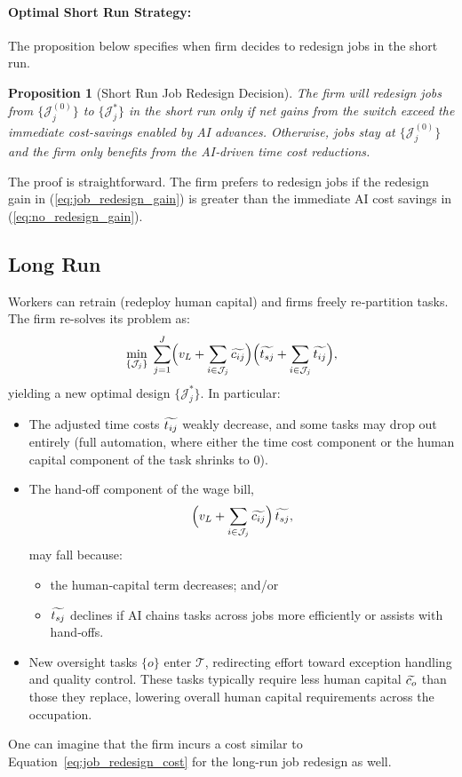\documentclass{article}
\theoremstyle{plain}
\theoremstyle{plain}
\newtheorem{proposition}[theorem]{Proposition}
\begin{document}
\paragraph{Optimal Short Run Strategy:}
The proposition below specifies when firm decides to redesign jobs in the short run.
\begin{proposition}[Short Run Job Redesign Decision] \label{prop:shortrun_redesign}
The firm will redesign jobs from \(\{\mathcal{J}_j^{(0)}\}\) to \(\{\mathcal{J}_j^*\}\) in the short run only if net gains from the switch exceed the immediate cost-savings enabled by AI advances.
Otherwise, jobs stay at \(\{\mathcal{J}_j^{(0)}\}\) and the firm only benefits from the AI‐driven time cost reductions.
\end{proposition}
The proof is straightforward. 
The firm prefers to redesign jobs if the redesign gain in (\ref{eq:job_redesign_gain}) is greater than the immediate AI cost savings in (\ref{eq:no_redesign_gain}).



\subsection{Long Run}  

Workers can retrain (redeploy human capital) and firms freely re‐partition tasks.  
The firm re-solves its problem as:
\[
\min_{\{\mathcal{J}_j\}}\;
\sum_{j=1}^J 
\Bigl(v_L + \sum_{i\in\mathcal{J}_j}\widetilde{c_{ij}}\Bigr)
\Bigl(\widetilde{t_{sj}} + \sum_{i\in\mathcal{J}_j}\widetilde{t_{ij}}\Bigr),
\]
yielding a new optimal design \(\{\mathcal{J}_j^*\}\).  
In particular:
\begin{itemize}
  \item The adjusted time costs \(\widetilde{t_{ij}}\) weakly decrease, and some tasks may drop out entirely (full automation, where either the time cost component or the human capital component of the task shrinks to 0).
  \item The hand‐off component of the wage bill,
  \[
    \Bigl(v_L + \sum_{i\in\mathcal{J}_j}\widetilde{c_{ij}}\Bigr)\,\widetilde{t_{sj}},
  \]
  may fall because:
  \begin{itemize}
    \item the human‐capital term decreases; and/or
    \item \(\widetilde{t_{sj}}\) declines if AI chains tasks across jobs more efficiently or assists with hand‐offs.
  \end{itemize}
  \item New oversight tasks \(\{o\}\) enter \(\mathcal{T}\), redirecting effort toward exception handling and quality control. These tasks typically require less human capital \(\widetilde{c_{o}}\) than those they replace, lowering overall human capital requirements across the occupation.
\end{itemize}
One can imagine that the firm incurs a cost similar to Equation~\ref{eq:job_redesign_cost} for the long-run job redesign as well.
\end{document}
